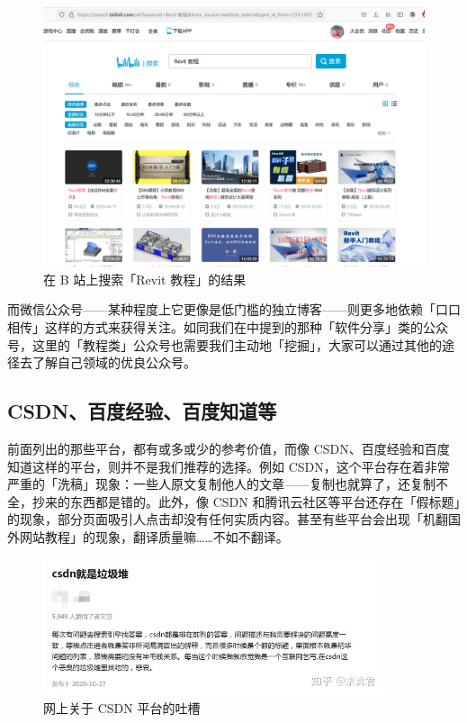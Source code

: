 \begin{figure}[htb!]
  \centering
  \includegraphics[width=12cm]{assets/Bilibili.png}
  \caption{在 B 站上搜索「Revit 教程」的结果}
  \label{Bilibili}
\end{figure}

而微信公众号——某种程度上它更像是低门槛的独立博客——则更多地依赖「口口相传」这样的方式来获得关注。如同我们在中提到的那种「软件分享」类的公众号，这里的「教程类」公众号也需要我们主动地「挖掘」，大家可以通过其他的途径去了解自己领域的优良公众号。

\subsection{CSDN、百度经验、百度知道等}

前面列出的那些平台，都有或多或少的参考价值，而像 CSDN、百度经验和百度知道这样的平台，则并不是我们推荐的选择。例如 CSDN，这个平台存在着非常严重的「洗稿」现象：一些人原文复制他人的文章——复制也就算了，还复制不全，抄来的东西都是错的。此外，像 CSDN 和腾讯云社区等平台还存在「假标题」的现象，部分页面吸引人点击却没有任何实质内容。甚至有些平台会出现「机翻国外网站教程」的现象，翻译质量嘛……不如不翻译。

\begin{figure}[htb!]
  \centering
  \includegraphics[width=10cm]{assets/CSDN_junk.png}
  \caption{网上关于 CSDN 平台的吐槽}
  \label{CSDN_junk}
\end{figure}

